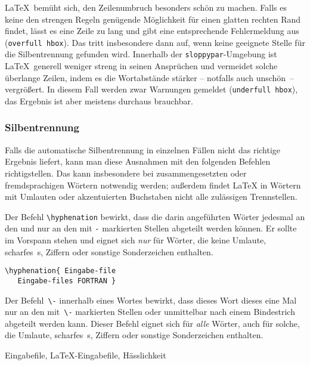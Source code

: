 \LaTeX\ bemüht sich, den Zeilenumbruch besonders schön zu
machen.  Falls es keine den strengen Regeln genügende
Möglichkeit für einen glatten rechten Rand findet, lässt es
eine Zeile zu lang und gibt eine entsprechende Fehlermeldung aus
(\texttt{over\-full hbox}).
Das tritt insbesondere dann auf, wenn keine geeignete Stelle
für die Silbentrennung gefunden wird.
Innerhalb der \texttt{sloppypar}-Umgebung ist \LaTeX\ generell
weniger streng in seinen Ansprüchen und vermeidet solche
überlange Zeilen, indem es die Wortabstände stärker --
notfalls auch unschön~-- vergrößert.
In diesem Fall werden zwar Warnungen gemeldet (\texttt{under\-full
hbox}), das Ergebnis ist aber meistens durchaus brauchbar.
 
 
\subsubsection{Silbentrennung} \label{silb}
 
Falls die automatische Silbentrennung in einzelnen Fällen nicht
das richtige Ergebnis liefert, kann man diese Ausnahmen mit den
folgenden Befehlen richtigstellen.
Das kann insbesondere bei zusammengesetzten oder fremdsprachigen
Wörtern notwendig werden; außerdem findet \LaTeX{} in Wörtern
mit Umlauten oder akzentuierten Buchstaben nicht alle zulässigen
Trennstellen.
 
Der Befehl \verb|\hyphenation| bewirkt, dass die darin
angeführten Wörter jedesmal an den und nur an den mit
\verb|-| markierten Stellen abgeteilt werden können.
Er sollte im Vorspann stehen und eignet sich
\emph{nur} für Wörter, die keine Umlaute, scharfes~s,
Ziffern oder sonstige Sonderzeichen enthalten.
\exa
~
\exb
\begin{verbatim}
\hyphenation{ Eingabe-file
   Eingabe-files FORTRAN }
\end{verbatim}
\exc
 
Der Befehl~\verb|\-| innerhalb eines Wortes bewirkt, dass dieses
Wort dieses eine Mal nur an den mit~\verb|\-|
markierten Stellen 
oder unmittelbar nach einem Bindestrich
abgeteilt werden kann.
Dieser Befehl eignet sich für \emph{alle} Wörter, auch für
solche, die Umlaute, scharfes~s, Ziffern oder sonstige
Sonderzeichen enthalten.
\begin{LTXexample}
Ein\-gabe\-file,
\LaTeX-Eingabe\-file,
Häss\-lich\-keit
\end{LTXexample}


